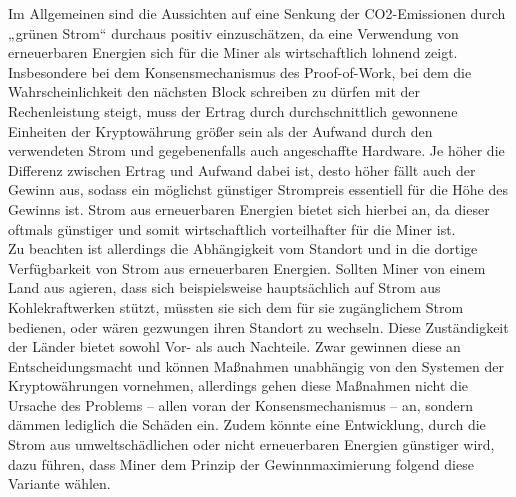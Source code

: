 \documentclass[12pt]{article}
\begin{document}
Im Allgemeinen sind die Aussichten auf eine Senkung der CO2-Emissionen durch „grünen Strom“ durchaus positiv einzuschätzen, da eine Verwendung von erneuerbaren Energien sich für die Miner als wirtschaftlich lohnend zeigt. Insbesondere bei dem Konsensmechanismus des Proof-of-Work, bei dem die Wahrscheinlichkeit den nächsten Block schreiben zu dürfen mit der Rechenleistung steigt, muss der Ertrag durch durchschnittlich gewonnene Einheiten der Kryptowährung größer sein als der Aufwand durch den verwendeten Strom und gegebenenfalls auch angeschaffte Hardware. Je höher die Differenz zwischen Ertrag und Aufwand dabei ist, desto höher fällt auch der Gewinn aus, sodass ein möglichst günstiger Strompreis essentiell für die Höhe des Gewinns ist. Strom aus erneuerbaren Energien bietet sich hierbei an, da dieser oftmals günstiger und somit wirtschaftlich vorteilhafter für die Miner ist.\\
Zu beachten ist allerdings die Abhängigkeit vom Standort und in die dortige Verfügbarkeit von Strom aus erneuerbaren Energien. Sollten Miner von einem Land aus agieren, dass sich beispielsweise hauptsächlich auf Strom aus Kohlekraftwerken stützt, müssten sie sich dem für sie zugänglichem Strom bedienen, oder wären gezwungen ihren Standort zu wechseln. Diese Zuständigkeit der Länder bietet sowohl Vor- als auch Nachteile. Zwar gewinnen diese an Entscheidungsmacht und können Maßnahmen unabhängig von den Systemen der Kryptowährungen vornehmen, allerdings gehen diese Maßnahmen nicht die Ursache des Problems – allen voran der Konsensmechanismus – an, sondern dämmen lediglich die Schäden ein. Zudem könnte eine Entwicklung, durch die Strom aus umweltschädlichen oder nicht erneuerbaren Energien günstiger wird, dazu führen, dass Miner dem Prinzip der Gewinnmaximierung folgend diese Variante wählen.
\end{document}
